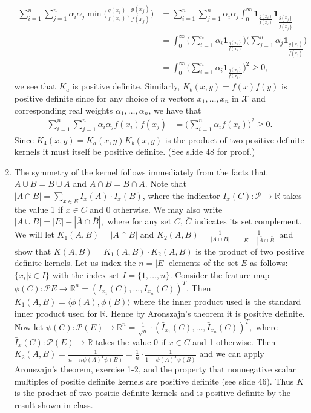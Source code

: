 \documentclass[12pt]{article}
\newenvironment{exercise}[2][Exercise]{\begin{trivlist}
\item[\hskip \labelsep {\bfseries #1}\hskip \labelsep {\bfseries #2.}]}{\end{trivlist}}
\begin{document}
\begin{exercise}{1}
\begin{enumerate}
			\begin{align*} \sum_{i=1}^n \sum_{j=1}^n \alpha_i \alpha_j \min\bigg(\frac{g(x_i)}{f(x_i)}, \frac{g(x_j)}{f(x_j)}\bigg) &= \sum_{i=1}^n \sum_{j=1}^n \alpha_i \alpha_j \int_{0}^\infty \mathbf{1}_{\frac{g(x_i)}{f(x_i)}} \mathbf{1}_{\frac{g(x_j)}{f(x_j)}}\\ &= \int_{0}^\infty  \bigg(\sum_{i=1}^n \alpha_i \mathbf{1}_{\frac{g(x_i)}{f(x_i)}} \bigg) \bigg(\sum_{j=1}^n \alpha_j \mathbf{1}_{\frac{g(x_j)}{f(x_j)}}\bigg)\\ &=  \int_{0}^\infty  \big(\sum_{i=1}^n \alpha_i \mathbf{1}_{\frac{g(x_i)}{f(x_i)}} \big)^2 \geq 0,\end{align*} we see that $K_a$ is positive definite. Similarly, $K_b(x,y) = f(x)f(y)$ is positive definite since for any choice of $n$ vectors $x_1, \ldots , x_n$ in $\mathcal{X}$ and corresponding real weights $\alpha_1, \ldots, \alpha_n$, we have that \begin{align*}\sum_{i=1}^n \sum_{j=1}^n \alpha_i \alpha_j f(x_i)f(x_j) &= \bigg(\sum_{i=1}^n \alpha_i f(x_i)\bigg)^2 \geq 0.\end{align*} Since $K_4(x,y) = K_a(x,y)K_b(x,y)$ is the product of two positive definite kernels it must itself be positive definite. (See slide 48 for proof.)
			\item The symmetry of the kernel follows immediately from the facts that $A \cup B = B \cup A$ and $A \cap B = B \cap A$. Note that $|A \cap B| = \sum_{x\in E} I_x(A) \cdot I_x(B)$, where the indicator $I_x(C): \mathcal{P} \rightarrow \mathbb{R}$ takes the value 1 if $x \in C$ and 0 otherwise. We may also write $|A \cup B| = |E| - |\bar{A} \cap \bar{B}|,$ where for any set $C$, $\bar{C}$ indicates its set complement. We will let $K_1(A,B) = |A \cap B|$ and $K_2(A,B) = \frac{1}{|A \cup B|} = \frac{1}{|E| - |\bar{A} \cap \bar{B}|}$ and show that $K(A,B) = K_1(A,B) \cdot K_2(A,B)$ is the product of two positive definite kernels. Let us index the $n=|E|$ elements of the set $E$ as follows: $\{x_i | i \in I \}$  with the index set $I=\{1,\ldots, n\}$. Consider the feature map $\phi(C): \mathcal{P}{E} \rightarrow \mathbb{R}^{n} = (I_{x_1}(C), \ldots, I_{x_n}(C))^T$. Then $K_1(A,B) = \langle \phi(A), \phi(B) \rangle$ where the inner product used is the standard inner product used for $\mathbb{R}$. Hence by Aronszajn's theorem it is positive definite. Now let $\psi(C): \mathcal{P}(E) \rightarrow \mathbb{R}^{n} = \frac{1}{\sqrt{n}}\cdot (\bar{I}_{x_1}(C), \ldots, \bar{I}_{x_n}(C))^T,$ where $\bar{I}_{x}(C): \mathcal{P}(E) \rightarrow \mathbb{R}$ takes the value 0 if $x \in C$ and 1 otherwise. Then $K_2(A,B) = \frac{1}{n - n \psi(A)^T\psi(B)} = \frac{1}{n} \cdot \frac{1}{1- \psi(A)^T\psi(B)}$ and we can apply Aronszajn's theorem, exercise 1-2, and the property that nonnegative scalar multiples of positie definite kernels are positive definite (see slide 46). Thus $K$ is the product of two positie definite kernels and is positive definite by the result shown in class.
				

\end{enumerate}
\end{exercise}
\end{document}
